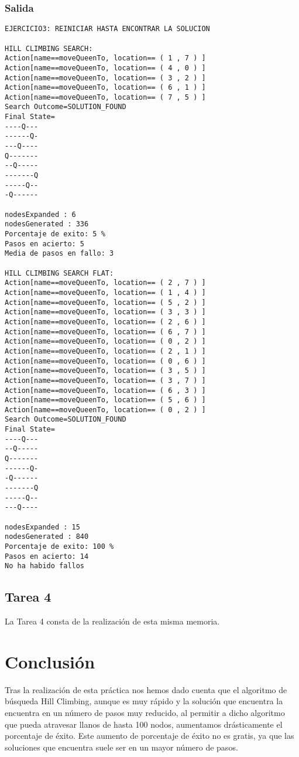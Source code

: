 \documentclass[a4paper]{article}
\begin{document}
\subsubsection{Salida}
\begin{lstlisting}[style=consola, numbers=none]
EJERCICIO3: REINICIAR HASTA ENCONTRAR LA SOLUCION

HILL CLIMBING SEARCH:
Action[name==moveQueenTo, location== ( 1 , 7 ) ]
Action[name==moveQueenTo, location== ( 4 , 0 ) ]
Action[name==moveQueenTo, location== ( 3 , 2 ) ]
Action[name==moveQueenTo, location== ( 6 , 1 ) ]
Action[name==moveQueenTo, location== ( 7 , 5 ) ]
Search Outcome=SOLUTION_FOUND
Final State=
----Q---
------Q-
---Q----
Q-------
--Q-----
-------Q
-----Q--
-Q------

nodesExpanded : 6
nodesGenerated : 336
Porcentaje de exito: 5 %
Pasos en acierto: 5
Media de pasos en fallo: 3

HILL CLIMBING SEARCH FLAT:
Action[name==moveQueenTo, location== ( 2 , 7 ) ]
Action[name==moveQueenTo, location== ( 1 , 4 ) ]
Action[name==moveQueenTo, location== ( 5 , 2 ) ]
Action[name==moveQueenTo, location== ( 3 , 3 ) ]
Action[name==moveQueenTo, location== ( 2 , 6 ) ]
Action[name==moveQueenTo, location== ( 6 , 7 ) ]
Action[name==moveQueenTo, location== ( 0 , 2 ) ]
Action[name==moveQueenTo, location== ( 2 , 1 ) ]
Action[name==moveQueenTo, location== ( 0 , 6 ) ]
Action[name==moveQueenTo, location== ( 3 , 5 ) ]
Action[name==moveQueenTo, location== ( 3 , 7 ) ]
Action[name==moveQueenTo, location== ( 6 , 3 ) ]
Action[name==moveQueenTo, location== ( 5 , 6 ) ]
Action[name==moveQueenTo, location== ( 0 , 2 ) ]
Search Outcome=SOLUTION_FOUND
Final State=
----Q---
--Q-----
Q-------
------Q-
-Q------
-------Q
-----Q--
---Q----

nodesExpanded : 15
nodesGenerated : 840
Porcentaje de exito: 100 %
Pasos en acierto: 14
No ha habido fallos
\end{lstlisting}

\subsection{Tarea 4}
La Tarea 4 consta de la realización de esta misma memoria.

\section{Conclusión}
Tras la realización de esta práctica nos hemos dado cuenta que el algoritmo de búsqueda Hill Climbing, aunque es muy rápido y la solución que encuentra la encuentra en un número de pasos muy reducido, al permitir a dicho algoritmo que pueda atravesar llanos de hasta 100 nodos, aumentamos drásticamente el porcentaje de éxito. Este aumento de porcentaje de éxito no es gratis, ya que las soluciones que encuentra suele ser en un mayor número de pasos.
\end{document}
